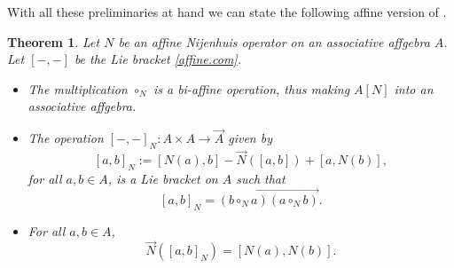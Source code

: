 \documentclass[pdftex]{sigma}
\numberwithin{equation}{section}
\newtheorem{Theorem}{Theorem}[section]
\begin{document}
With all these preliminaries at hand we can state the following affine version of \cite[Theorem~8]{4}.

\begin{Theorem}\label{thm.affine.Lie}
Let $N$ be an affine Nijenhuis operator on an associative affgebra $A$. Let $[-,-]$ be the Lie bracket \eqref{affine.com}.
\begin{itemize}\itemsep=0pt
 \item[$(1)$] The multiplication $\circ_N$ is a bi-affine operation, thus making $A[N]$ into an associative affgebra.
 \item[$(2)$] The operation $[-,-]_N\colon A\times A\to \vec{A}$ given by
 \[
 [a,b]_N := [N(a),b] -\vec{N}([a,b]) + [a, N(b)],
 \]
 for all $a,b\in A$, is a Lie bracket on $A$ such that
 \[
 [a,b]_N = \overrightarrow{(b\circ_N a)(a\circ_N b)}.
 \]
 \item[$(3)$] For all $a,b\in A$,
 \[
\vec{N}([a,b]_N) = [N(a), N(b)].
 \]
\end{itemize}
\end{Theorem}
\end{document}
